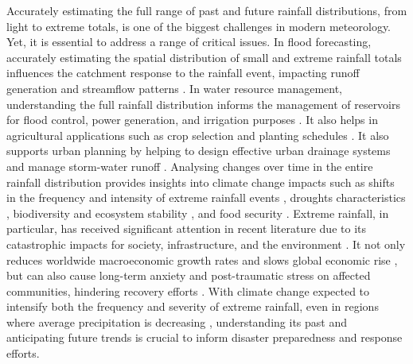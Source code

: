 \documentclass{ametsocV6.1}
\begin{document}
Accurately estimating the full range of past and future rainfall distributions, from light to extreme totals, is one of the biggest challenges in modern meteorology. Yet, it is essential to address a range of critical issues. In flood forecasting, accurately estimating the spatial distribution of small and extreme rainfall totals influences the catchment response to the rainfall event, impacting runoff generation and streamflow patterns \citep{Cuo2011, WangKarimi2022}. In water resource management, understanding the full rainfall distribution informs the management of reservoirs for flood control, power generation, and irrigation purposes \citep{Tie2023}. It also helps in agricultural applications such as crop selection and planting schedules \citep{Janmohammadi2023, Maurya2024}. It also supports urban planning by helping to design effective urban drainage systems and manage storm-water runoff \citep{Hossain2024, Laouacheria2019}. Analysing changes over time in the entire rainfall distribution provides insights into climate change impacts such as shifts in the frequency and intensity of extreme rainfall events \citep{Tye2022}, droughts characteristics \citep{Haile2020}, biodiversity and ecosystem stability \citep{Lamprecht2021}, and food security \citep{Balasundram2023}. Extreme rainfall, in particular, has received significant attention in recent literature \citep{Gimeno2022, Schumacher2017} due to its catastrophic impacts for society, infrastructure, and the environment \citep{IPCC2023, WMO2024}. It not only reduces worldwide macroeconomic growth rates and slows global economic rise \citep{Liang2022}, but can also cause long-term anxiety and post-traumatic stress on affected communities, hindering recovery efforts \citep{Doocy2013}. With climate change expected to intensify both the frequency and severity of extreme rainfall, even in regions where average precipitation is decreasing \citep{Asadieh2015, Westra2014, Zittis2021}, understanding its past and anticipating future trends is crucial to inform disaster preparedness and response efforts. 
\end{document}
